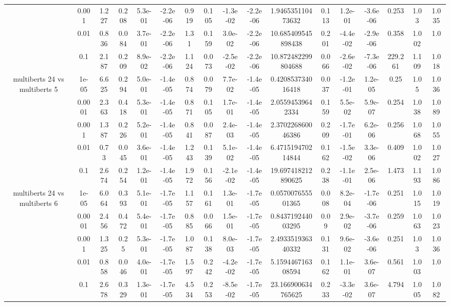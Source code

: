 \begin{tabular}{|c|c|c|c|c|c|c|c|c|c|c|c|c|c|c|c|c|}
 & 0.001 & 1.227 & 0.208 & 5.3e-01 & -2.2e-06 & 0.919 & 0.105 & -1.3e-02 & -2.2e-06 & 1.946535110473632 & 0.113 & 1.2e-01 & -3.6e-06 & 0.253 & 1.03 & 1.035 \\
 & 0.01 & 0.836 & 0.084 & 3.7e-01 & -2.2e-06 & 1.31 & 0.159 & 3.0e-02 & -2.2e-06 & 10.685409545898438 & 0.201 & -4.4e-02 & -2.9e-06 & 0.358 & 1.002 & 1.0 \\
 & 0.1 & 2.187 & 0.209 & 8.9e-02 & -2.2e-06 & 1.124 & 0.073 & -2.5e-02 & -2.2e-06 & 10.872482299804688 & 0.066 & -2.6e-02 & -7.3e-06 & 229.261 & 1.109 & 1.018 \\
\hline
\multirow{5}{*}{multiberts 24 vs multiberts 5} & 1e-05 & 6.625 & 0.294 & 5.0e-01 & -1.4e-05 & 0.874 & 0.079 & 7.7e-02 & -1.4e-05 & 0.420853734016418 & 0.037 & -1.2e-01 & 1.2e-05 & 0.25 & 1.05 & 1.036 \\
 & 0.0001 & 2.363 & 0.418 & 5.3e-01 & -1.4e-05 & 0.871 & 0.105 & 1.7e-01 & -1.4e-05 & 2.05594539642334 & 0.159 & 5.5e-02 & 5.9e-07 & 0.254 & 1.038 & 1.089 \\
 & 0.001 & 1.387 & 0.226 & 5.2e-01 & -1.4e-05 & 0.841 & 0.087 & 2.4e-03 & -1.4e-05 & 2.370226860046386 & 0.209 & -1.7e-01 & 6.2e-06 & 0.256 & 1.068 & 1.055 \\
 & 0.01 & 0.73 & 0.045 & 3.6e-01 & -1.4e-05 & 1.243 & 0.139 & 5.1e-02 & -1.4e-05 & 6.471519470214844 & 0.162 & -1.5e-02 & 3.3e-06 & 0.409 & 1.002 & 1.027 \\
 & 0.1 & 2.674 & 0.254 & 1.2e-01 & -1.4e-05 & 1.972 & 0.156 & -2.1e-02 & -1.4e-05 & 19.697418212890625 & 0.238 & -1.1e-01 & 2.5e-06 & 1.473 & 1.193 & 1.086 \\
\hline
\multirow{5}{*}{multiberts 24 vs multiberts 6} & 1e-05 & 6.064 & 0.393 & 5.1e-01 & -1.7e-05 & 1.157 & 0.161 & 1.3e-01 & -1.7e-05 & 0.057007655501365 & 0.008 & 8.2e-04 & -1.7e-06 & 0.251 & 1.015 & 1.019 \\
 & 0.0001 & 2.456 & 0.472 & 5.4e-01 & -1.7e-05 & 0.885 & 0.066 & 1.5e-01 & -1.7e-05 & 0.843719244003295 & 0.09 & 2.9e-02 & -3.7e-06 & 0.259 & 1.063 & 1.023 \\
 & 0.001 & 1.325 & 0.25 & 5.3e-01 & -1.7e-05 & 1.087 & 0.138 & 8.0e-03 & -1.7e-05 & 2.493351936340332 & 0.131 & 9.6e-02 & -3.6e-06 & 0.251 & 1.03 & 1.036 \\
 & 0.01 & 0.858 & 0.046 & 4.0e-01 & -1.7e-05 & 1.597 & 0.242 & -4.2e-02 & -1.7e-05 & 5.159446716308594 & 0.162 & 1.1e-01 & 3.6e-07 & 0.561 & 1.003 & 1.0 \\
 & 0.1 & 2.678 & 0.329 & 1.3e-01 & -1.7e-05 & 4.534 & 0.253 & -8.5e-02 & -1.7e-05 & 23.166900634765625 & 0.233 & -3.3e-02 & 3.6e-07 & 4.794 & 1.005 & 1.082 \\

\end{tabular}
